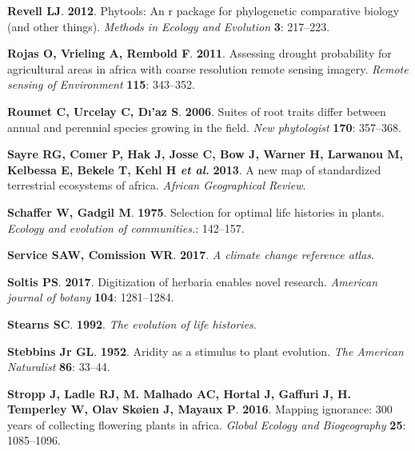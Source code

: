 \documentclass[man,floatsintext]{apa6}
\theoremstyle{definition}
\theoremstyle{definition}
\theoremstyle{definition}
\theoremstyle{remark}
\begin{document}
\leavevmode\hypertarget{ref-revell2012phytools}{}%
\textbf{\textnormal{Revell LJ}}. \textbf{2012}. Phytools: An r package
for phylogenetic comparative biology (and other things). \emph{Methods
in Ecology and Evolution} \textbf{3}: 217--223.

\leavevmode\hypertarget{ref-rojas2011assessing}{}%
\textbf{\textnormal{Rojas O}, \textnormal{Vrieling A},
\textnormal{Rembold F}}. \textbf{2011}. Assessing drought probability
for agricultural areas in africa with coarse resolution remote sensing
imagery. \emph{Remote sensing of Environment} \textbf{115}: 343--352.

\leavevmode\hypertarget{ref-roumet2006suites}{}%
\textbf{\textnormal{Roumet C}, \textnormal{Urcelay C}, \textnormal{Dı'az
S}}. \textbf{2006}. Suites of root traits differ between annual and
perennial species growing in the field. \emph{New phytologist}
\textbf{170}: 357--368.

\leavevmode\hypertarget{ref-sayre2013new}{}%
\textbf{\textnormal{Sayre RG}, \textnormal{Comer P}, \textnormal{Hak J},
\textnormal{Josse C}, \textnormal{Bow J}, \textnormal{Warner H},
\textnormal{Larwanou M}, \textnormal{Kelbessa E}, \textnormal{Bekele T},
\textnormal{Kehl H} \emph{et al.}} \textbf{2013}. A new map of
standardized terrestrial ecosystems of africa. \emph{African
Geographical Review}.

\leavevmode\hypertarget{ref-schaffer1975selection}{}%
\textbf{\textnormal{Schaffer W}, \textnormal{Gadgil M}}. \textbf{1975}.
Selection for optimal life histories in plants. \emph{Ecology and
evolution of communities.}: 142--157.

\leavevmode\hypertarget{ref-south2017a}{}%
\textbf{\textnormal{Service SAW}, \textnormal{Comission WR}}.
\textbf{2017}. \emph{A climate change reference atlas}.

\leavevmode\hypertarget{ref-soltis2017digitization}{}%
\textbf{\textnormal{Soltis PS}}. \textbf{2017}. Digitization of herbaria
enables novel research. \emph{American journal of botany} \textbf{104}:
1281--1284.

\leavevmode\hypertarget{ref-stearns1992evolution}{}%
\textbf{\textnormal{Stearns SC}}. \textbf{1992}. \emph{The evolution of
life histories}.

\leavevmode\hypertarget{ref-stebbins1952aridity}{}%
\textbf{\textnormal{Stebbins Jr GL}}. \textbf{1952}. Aridity as a
stimulus to plant evolution. \emph{The American Naturalist} \textbf{86}:
33--44.

\leavevmode\hypertarget{ref-stropp2016mapping}{}%
\textbf{\textnormal{Stropp J}, \textnormal{Ladle RJ}, \textnormal{M.
Malhado AC}, \textnormal{Hortal J}, \textnormal{Gaffuri J},
\textnormal{H. Temperley W}, \textnormal{Olav Skøien J},
\textnormal{Mayaux P}}. \textbf{2016}. Mapping ignorance: 300 years of
collecting flowering plants in africa. \emph{Global Ecology and
Biogeography} \textbf{25}: 1085--1096.
\end{document}
